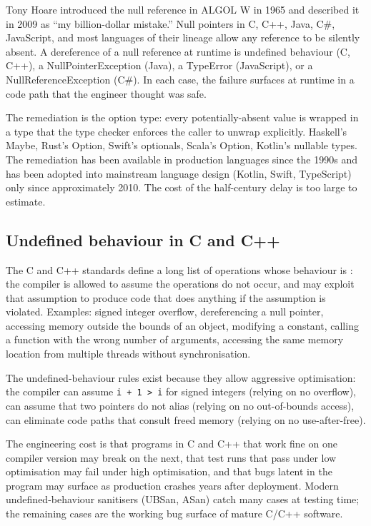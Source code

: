Tony Hoare introduced the null reference in ALGOL W in 1965 and described it in 2009 as ``my billion-dollar mistake.'' Null pointers in C, C++, Java, C\#, JavaScript, and most languages of their lineage allow any reference to be silently absent. A dereference of a null reference at runtime is undefined behaviour (C, C++), a NullPointerException (Java), a TypeError (JavaScript), or a NullReferenceException (C\#). In each case, the failure surfaces at runtime in a code path that the engineer thought was safe.

The remediation is the option type: every potentially-absent value is wrapped in a type that the type checker enforces the caller to unwrap explicitly. Haskell's Maybe, Rust's Option, Swift's optionals, Scala's Option, Kotlin's nullable types. The remediation has been available in production languages since the 1990s and has been adopted into mainstream language design (Kotlin, Swift, TypeScript) only since approximately 2010. The cost of the half-century delay is too large to estimate.

\subsection{Undefined behaviour in C and C++}

The C and C++ standards define a long list of operations whose behaviour is : the compiler is allowed to assume the operations do not occur, and may exploit that assumption to produce code that does anything if the assumption is violated. Examples: signed integer overflow, dereferencing a null pointer, accessing memory outside the bounds of an object, modifying a constant, calling a function with the wrong number of arguments, accessing the same memory location from multiple threads without synchronisation.

The undefined-behaviour rules exist because they allow aggressive optimisation: the compiler can assume \texttt{i + 1 > i} for signed integers (relying on no overflow), can assume that two pointers do not alias (relying on no out-of-bounds access), can eliminate code paths that consult freed memory (relying on no use-after-free).

The engineering cost is that programs in C and C++ that work fine on one compiler version may break on the next, that test runs that pass under low optimisation may fail under high optimisation, and that bugs latent in the program may surface as production crashes years after deployment. Modern undefined-behaviour sanitisers (UBSan, ASan) catch many cases at testing time; the remaining cases are the working bug surface of mature C/C++ software.

